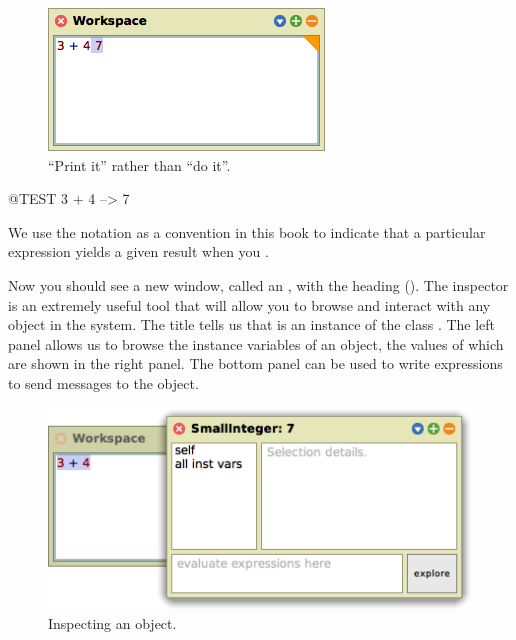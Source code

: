 \documentclass[a4paper,10pt,twoside]{book}
\begin{document}
\begin{figure}[htb]
\centerline {\includegraphics[scale=0.65]{PrintIt}}
\caption{``Print it'' rather than ``do it''. \label{fig:printit}}
\end{figure}

\begin{code}{@TEST}
3 + 4 --> 7
\end{code}
\noindent
We use the notation \ct{-->} as a convention in this book to indicate that a particular \sq expression yields a given result when you .

\noindent
Now you should see a new window, called an , with the heading  ().
The inspector is an extremely useful tool that will allow you to browse and interact with any object in the system.
The title tells us that  is an instance of the class .
The left panel allows us to browse the instance variables of an object, the values of which are shown in the right panel.
The bottom panel can be used to write expressions to send messages to the object.

\begin{figure}[htb]
\centerline {\includegraphics[scale=0.65]{InspectIt}}
\caption{Inspecting an object. \label{fig:inspectit}}
\end{figure}
\end{document}
